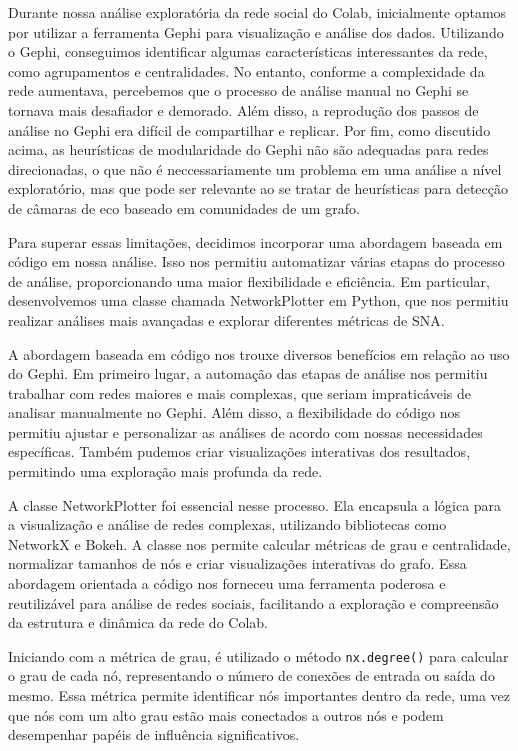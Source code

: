 Durante nossa análise exploratória da rede social do Colab, inicialmente optamos por utilizar a ferramenta Gephi para visualização e análise dos dados. Utilizando o Gephi, conseguimos identificar algumas características interessantes da rede, como agrupamentos e centralidades. No entanto, conforme a complexidade da rede aumentava, percebemos que o processo de análise manual no Gephi se tornava mais desafiador e demorado. Além disso, a reprodução dos passos de análise no Gephi era difícil de compartilhar e replicar. Por fim, como discutido acima, as heurísticas de modularidade do Gephi não são adequadas para redes direcionadas, o que não é neccessariamente um problema em uma análise a nível exploratório, mas que pode ser relevante ao se tratar de heurísticas para detecção de câmaras de eco baseado em comunidades de um grafo.

Para superar essas limitações, decidimos incorporar uma abordagem baseada em código em nossa análise. Isso nos permitiu automatizar várias etapas do processo de análise, proporcionando uma maior flexibilidade e eficiência. Em particular, desenvolvemos uma classe chamada NetworkPlotter em Python, que nos permitiu realizar análises mais avançadas e explorar diferentes métricas de SNA.

A abordagem baseada em código nos trouxe diversos benefícios em relação ao uso do Gephi. Em primeiro lugar, a automação das etapas de análise nos permitiu trabalhar com redes maiores e mais complexas, que seriam impraticáveis de analisar manualmente no Gephi. Além disso, a flexibilidade do código nos permitiu ajustar e personalizar as análises de acordo com nossas necessidades específicas. Também pudemos criar visualizações interativas dos resultados, permitindo uma exploração mais profunda da rede.

A classe NetworkPlotter foi essencial nesse processo. Ela encapsula a lógica para a visualização e análise de redes complexas, utilizando bibliotecas como NetworkX e Bokeh. A classe nos permite calcular métricas de grau e centralidade, normalizar tamanhos de nós e criar visualizações interativas do grafo. Essa abordagem orientada a código nos forneceu uma ferramenta poderosa e reutilizável para análise de redes sociais, facilitando a exploração e compreensão da estrutura e dinâmica da rede do Colab.

Iniciando com a métrica de grau, é utilizado o método \texttt{nx.degree()} para calcular o grau de cada nó, representando o número de conexões de entrada ou saída do mesmo. Essa métrica permite identificar nós importantes dentro da rede, uma vez que nós com um alto grau estão mais conectados a outros nós e podem desempenhar papéis de influência significativos.

